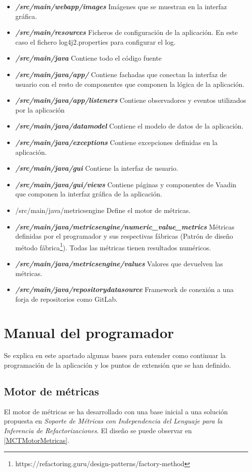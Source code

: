 \begin{itemize}
	\item \textbf{\textit{/src/main/webapp/images}} Imágenes que se muestran en la interfaz gráfica.
	\item \textbf{\textit{/src/main/resources}} Ficheros de configuración de la aplicación. En este caso el fichero log4j2.properties para configurar el log.
	\item \textbf{\textit{/src/main/java}} Contiene todo el código fuente
	\item \textbf{\textit{/src/main/java/app/}} Contiene fachadas que conectan la interfaz de usuario con el resto de componentes que componen la lógica de la aplicación.
	\item \textbf{\textit{/src/main/java/app/listeners}} Contiene observadores y eventos utilizados por la aplicación
	\item \textbf{\textit{/src/main/java/datamodel}} Contiene el modelo de datos de la aplicación.
	\item \textbf{\textit{/src/main/java/exceptions}} Contiene excepciones definidas en la aplicación.
	\item \textbf{\textit{/src/main/java/gui}} Contiene la interfaz de usuario.
	\item \textbf{\textit{/src/main/java/gui/views}} Contiene páginas y componentes de Vaadin que componen la interfaz gráfica de la aplicación.
	\item /src/main/java/metricsengine Define el motor de métricas.
	\item \textbf{\textit{/src/main/java/metricsengine/numeric\_value\_metrics}} Métricas definidas por el programador y sus respectivas fábricas (Patrón de diseño método fábrica\footnote{https://refactoring.guru/design-patterns/factory-method}). Todas las métricas tienen resultados numéricos.
	\item \textbf{\textit{/src/main/java/metricsengine/values}} Valores que devuelven las métricas.
	\item \textbf{\textit{/src/main/java/repositorydatasource}} Framework de conexión a una forja de repositorios como GitLab.
\end{itemize}
\section{Manual del programador}
Se explica en este apartado algunas bases para entender como continuar la programación de la aplicación y los puntos de extensión que se han definido.
\subsection{Motor de métricas}
El motor de métricas se ha desarrollado con una base inicial a una solución propuesta en \textit{Soporte de Métricas con Independencia del Lenguaje para la Inferencia de Refactorizaciones}\cite{marticorena_soporte_2005}. El diseño se puede observar en \ref{MCTMotorMetricas}.
